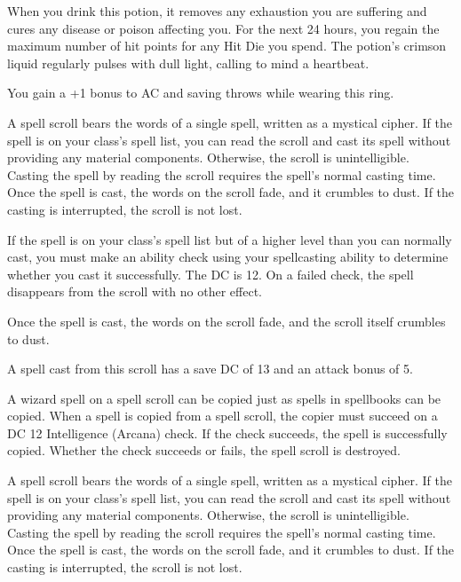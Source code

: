 \documentclass[10pt,a4paper,twoside,bg=print,twocolumn,openany,nodeprecatedcode]{dndbook}
\begin{document}
When you drink this potion, it removes any exhaustion you are suffering and cures any disease or poison affecting you. For the next 24 hours, you regain the maximum number of hit points for any Hit Die you spend. The potion's crimson liquid regularly pulses with dull light, calling to mind a heartbeat.

You gain a +1 bonus to AC and saving throws while wearing this ring.

A spell scroll bears the words of a single spell, written as a mystical cipher. If the spell is on your class's spell list, you can read the scroll and cast its spell without providing any material components. Otherwise, the scroll is unintelligible. Casting the spell by reading the scroll requires the spell's normal casting time. Once the spell is cast, the words on the scroll fade, and it crumbles to dust. If the casting is interrupted, the scroll is not lost.

If the spell is on your class's spell list but of a higher level than you can normally cast, you must make an ability check using your spellcasting ability to determine whether you cast it successfully. The DC is 12. On a failed check, the spell disappears from the scroll with no other effect.

Once the spell is cast, the words on the scroll fade, and the scroll itself crumbles to dust.

A spell cast from this scroll has a save DC of 13 and an attack bonus of 5.

A wizard spell on a spell scroll can be copied just as spells in spellbooks can be copied. When a spell is copied from a spell scroll, the copier must succeed on a DC 12 Intelligence (Arcana) check. If the check succeeds, the spell is successfully copied. Whether the check succeeds or fails, the spell scroll is destroyed.

A spell scroll bears the words of a single spell, written as a mystical cipher. If the spell is on your class's spell list, you can read the scroll and cast its spell without providing any material components. Otherwise, the scroll is unintelligible. Casting the spell by reading the scroll requires the spell's normal casting time. Once the spell is cast, the words on the scroll fade, and it crumbles to dust. If the casting is interrupted, the scroll is not lost.
\end{document}

